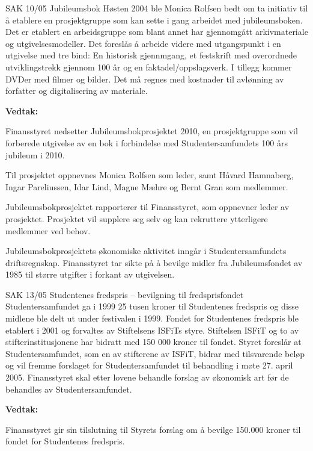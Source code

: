\begin{instruksledd}{SAK 10/05 Jubileumsbok}
    Høsten 2004 ble Monica Rolfsen bedt om ta initiativ til å etablere en prosjektgruppe
    som kan sette i gang arbeidet
    med jubileumsboken. Det er etablert en arbeidsgruppe som blant annet har gjennomgått
    arkivmateriale og
    utgivelsesmodeller. Det foreslås å arbeide videre med utgangspunkt i en utgivelse med
    tre bind: En historisk
    gjennmgang, et festskrift med overordnede utviklingstrekk gjennom 100 år og en
    faktadel/oppslagsverk. I tillegg
    kommer DVDer med filmer og bilder. Det må regnes med kostnader til avlønning av
    forfatter og digitalisering av
    materiale.
    
    
    \textbf{Vedtak:}

    Finansstyret nedsetter Jubileumsbokprosjektet 2010, en prosjektgruppe som vil
    forberede utgivelse av en bok i
    forbindelse med Studentersamfundets 100 års jubileum i 2010.
    
    Til prosjektet oppnevnes Monica Rolfsen som leder, samt Håvard Hamnaberg, Ingar
    Pareliussen, Idar Lind, Magne
    Mæhre og Bernt Gran som medlemmer.
    
    Jubileumsbokprosjektet rapporterer til Finansstyret, som oppnevner leder av
    prosjektet. Prosjektet vil supplere seg
    selv og kan rekruttere ytterligere medlemmer ved behov.
    
    Jubileumsbokprosjektets økonomiske aktivitet inngår i Studentersamfundets
    driftsregnskap. Finansstyret tar sikte på å
    bevilge midler fra Jubileumsfondet av 1985 til større utgifter i forkant av
    utgivelsen.


\end{instruksledd}

\begin{instruksledd}{SAK 13/05 Studentenes fredspris – bevilgning til fredsprisfondet}
    Studentersamfundet ga i 1999 25 tusen kroner til Studentenes fredspris og disse
    midlene ble delt ut under festivalen i
    1999. Fondet for Studentenes fredspris ble etablert i 2001 og forvaltes av Stiftelsens
    ISFiTs styre. Stiftelsen ISFiT og
    to av stifterinstitusjonene har bidratt med 150 000 kroner til fondet. Styret foreslår
    at Studentersamfundet, som en av
    stifterene av ISFiT, bidrar med tilsvarende beløp og vil fremme forslaget for
    Studentersamfundet til behandling i møte
    27. april 2005. Finansstyret skal etter lovene behandle forslag av økonomisk art før
    de behandles av
    Studentersamfundet.
    
    \textbf{Vedtak:}

    Finansstyret gir sin tilslutning til Styrets forslag om å bevilge 150.000 kroner til
    fondet for Studentenes fredspris.

\end{instruksledd}

